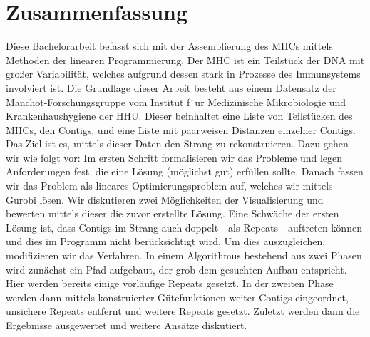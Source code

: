 \chapter*{Zusammenfassung}


Diese Bachelorarbeit befasst sich mit der Assemblierung des MHCs mittels Methoden der linearen Programmierung.
Der MHC ist ein Teilstück der DNA mit großer Variabilität, welches aufgrund dessen stark in Prozesse des Immunsystems involviert ist. 
Die Grundlage dieser Arbeit besteht aus einem Datensatz der Manchot-Forschungsgruppe vom Institut f¨ur Medizinische Mikrobiologie und Krankenhaushygiene der HHU. Dieser beinhaltet eine Liste von Teilstücken des MHCs, den Contigs, und eine Liste mit paarweisen Distanzen einzelner Contigs. Das Ziel ist es, mittels dieser Daten den Strang zu rekonstruieren.
Dazu gehen wir wie folgt vor: Im ersten Schritt formalisieren wir das Probleme und legen Anforderungen fest, die eine Lösung (möglichst gut) erfüllen sollte. Danach fassen wir das Problem als lineares Optimierungsproblem auf, welches wir mittels Gurobi lösen. Wir diskutieren zwei Möglichkeiten der Visualisierung und bewerten mittels dieser die zuvor erstellte Lösung. 
Eine Schwäche der ersten Lösung ist, dass Contigs im Strang auch doppelt - als Repeats - auftreten können und dies im Programm nicht berücksichtigt wird.
Um dies auszugleichen, modifizieren wir das Verfahren. In einem Algorithmus bestehend aus zwei Phasen wird zunächst ein Pfad aufgebaut, der grob dem gesuchten Aufbau entspricht. Hier werden bereits einige vorläufige Repeats gesetzt. In der zweiten Phase werden dann mittels konstruierter Gütefunktionen weiter Contigs eingeordnet, unsichere Repeats entfernt und weitere Repeats gesetzt.
Zuletzt werden dann die Ergebnisse ausgewertet und weitere Ansätze diskutiert.